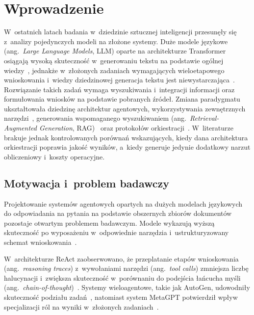 \chapter{Wprowadzenie}\label{chap:wprowadzenie}

W~ostatnich latach badania w~dziedzinie sztucznej inteligencji przesunęły się
z~analizy pojedynczych modeli na złożone systemy. Duże modele językowe
(ang.~\textit{Large Language Models}, LLM) oparte na architekturze Transformer
osiągają wysoką skuteczność w~generowaniu tekstu na podstawie ogólnej
wiedzy~\cite{vaswani2017attention}, jednakże w~złożonych zadaniach wymagających
wieloetapowego wnioskowania i~wiedzy dziedzinowej generacja tekstu jest
niewystarczająca~\cite{brown2020language}. Rozwiązanie takich zadań wymaga
wyszukiwania i~integracji informacji oraz formułowania wniosków na podstawie
pobranych źródeł. Zmiana paradygmatu ukształtowała dziedzinę architektur
agentowych, wykorzystywania zewnętrznych narzędzi~\cite{schick2023toolformer},
generowania wspomaganego wyszukiwaniem (ang.~\textit{Retrieval-Augmented
Generation}, RAG)~\cite{lewis2020retrieval} oraz protokołów
orkiestracji~\cite{wang2024survey}. W~literaturze brakuje jednak kontrolowanych
porównań wskazujących, kiedy dana architektura orkiestracji poprawia jakość
wyników, a~kiedy generuje jedynie dodatkowy narzut obliczeniowy i~koszty
operacyjne.

\section{Motywacja i~problem badawczy}\label{sec:motywacja-i-problem-badawczy}

Projektowanie systemów agentowych opartych na dużych modelach językowych do
odpowiadania na pytania na podstawie obszernych zbiorów dokumentów pozostaje
otwartym problemem badawczym. Modele wykazują wyższą skuteczność po wyposażeniu
w~odpowiednie narzędzia i~ustrukturyzowany schemat
wnioskowania~\cite{wang2024survey}.

W~architekturze ReAct zaobserwowano, że przeplatanie etapów wnioskowania
(ang.~\textit{reasoning traces}) z~wywołaniami narzędzi (ang.~\textit{tool
calls}) zmniejsza liczbę halucynacji i~zwiększa skuteczność w~porównaniu do
podejścia łańcucha myśli (ang.~\textit{chain-of-thought})~\cite{yao2022react}.
Systemy wieloagentowe, takie jak AutoGen, udowodniły skuteczność podziału
zadań~\cite{wu2024autogen}, natomiast system MetaGPT potwierdził wpływ
specjalizacji ról na wyniki w~złożonych zadaniach~\cite{hong2023metagpt}.

